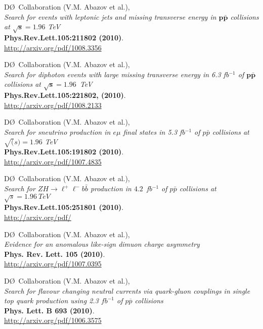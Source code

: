 \documentclass[12pt]{article}
\begin{document}
D\O~Collaboration (V.M. Abazov et al.), \\
\textsl{Search for events with leptonic jets and missing transverse energy in $\mathbf{p\bar{p}}$ collisions at $\mathbf{\sqrt{s}=1.96}$ TeV}\\
\textbf{Phys.Rev.Lett.105:211802 (2010)}.\\
{\small{\url{http://arxiv.org/pdf/1008.3356}}}\vspace{4mm}

D\O~Collaboration (V.M. Abazov et al.), \\
\textsl{Search for diphoton events with large missing transverse energy in 6.3 fb$^{-1}$ of $\mathbf{p\bar{p}}$ collisions at $\mathbf{\sqrt{s}=1.96}$~TeV}\\
\textbf{Phys.Rev.Lett.105:221802, (2010)}.\\
{\small{\url{http://arxiv.org/pdf/1008.2133}}}\vspace{4mm}

D\O~Collaboration (V.M. Abazov et al.), \\
\textsl{Search for sneutrino production in $e\mu$ final states in 5.3 fb$^{-1}$ of $p\bar{p}$ collisions at $\sqrt(s) =1.96$ TeV}\\
\textbf{ Phys.Rev.Lett.105:191802 (2010)}.\\
{\small{\url{http://arxiv.org/pdf/1007.4835}}}\vspace{4mm}


D\O~Collaboration (V.M. Abazov et al.), \\
\textsl{Search for $ZH \rightarrow \ell^+\ell^-b\bar{b}$ production in $4.2$~fb$^{-1}$ of $p\bar{p}$ collisions at $\sqrt{s}=1.96~TeV$}\\
\textbf{Phys.Rev.Lett.105:251801 (2010)}.\\
{\small{\url{http://arxiv.org/pdf/}}}\vspace{4mm}


D\O~Collaboration (V.M. Abazov et al.), \\
\textsl{Evidence for an anomalous like-sign dimuon charge asymmetry}\\
\textbf{Phys. Rev. Lett. 105 (2010)}.\\
{\small{\url{http://arxiv.org/pdf/1007.0395}}}\vspace{4mm}

%
D\O~Collaboration (V.M. Abazov et al.), \\
\textsl{Search for flavour changing neutral currents via quark-gluon couplings in single top quark production using 2.3 $fb^{-1}$ of $p\overline{p}$ collisions}\\
\textbf{Phys. Lett. B 693 (2010)}.\\
{\small{\url{http://arxiv.org/pdf/1006.3575}}}\vspace{4mm}
\end{document}
